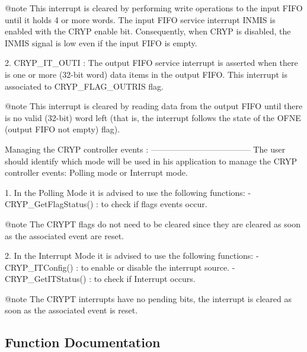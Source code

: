 \begin{DoxyVerb}
                @note This interrupt is cleared by performing write operations 
                      to the input FIFO until it holds 4 or more words. The 
                      input FIFO service interrupt INMIS is enabled with the 
                      CRYP enable bit. Consequently, when CRYP is disabled, the 
                      INMIS signal is low even if the input FIFO is empty.



   2. CRYP_IT_OUTI  : The output FIFO service interrupt is asserted when there 
                      is one or more (32-bit word) data items in the output FIFO.
                      This interrupt is associated to CRYP_FLAG_OUTRIS flag.

                @note This interrupt is cleared by reading data from the output 
                      FIFO until there is no valid (32-bit) word left (that is, 
                      the interrupt follows the state of the OFNE (output FIFO 
                      not empty) flag).


  Managing the CRYP controller events :
  ------------------------------------ 
  The user should identify which mode will be used in his application to manage 
  the CRYP controller events: Polling mode or Interrupt mode.

  1.  In the Polling Mode it is advised to use the following functions:
      - CRYP_GetFlagStatus() : to check if flags events occur. 

  @note  The CRYPT flags do not need to be cleared since they are cleared as 
         soon as the associated event are reset.   


  2.  In the Interrupt Mode it is advised to use the following functions:
      - CRYP_ITConfig()       : to enable or disable the interrupt source.
      - CRYP_GetITStatus()    : to check if Interrupt occurs.

  @note  The CRYPT interrupts have no pending bits, the interrupt is cleared as 
         soon as the associated event is reset. \end{DoxyVerb}
 

\subsection{Function Documentation}
\hypertarget{group___c_r_y_p___group5_ga993d568b626a74b2973d4a6848a681f6}{}

